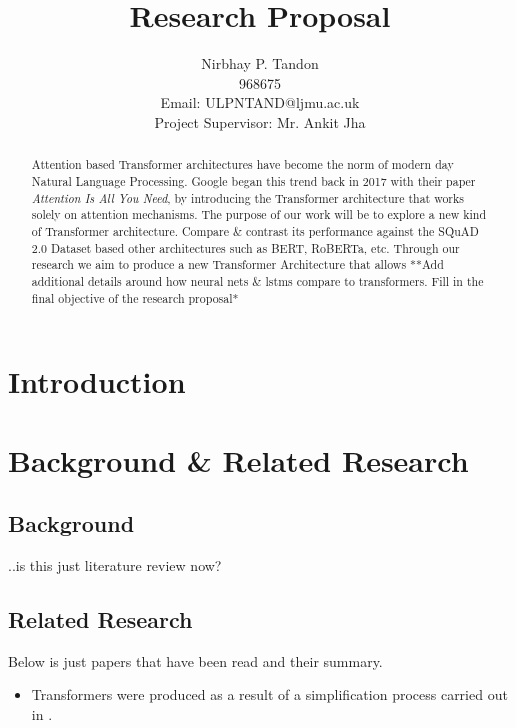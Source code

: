 \documentclass[11pt]{article}
\begin{document}
\title{Research Proposal}

\author{Nirbhay P. Tandon\\968675\\Email: ULPNTAND@ljmu.ac.uk\\
Project Supervisor: Mr. Ankit Jha
}
\date{}
\maketitle


\begin{abstract}
Attention based Transformer architectures have become the norm of modern day Natural Language Processing. Google began this trend back in 2017 with their paper \textit{Attention Is All You Need}\cite{atayl}, by introducing the Transformer architecture that works solely on attention mechanisms. The purpose of our work will be to explore a new kind of Transformer architecture. Compare \& contrast its performance against the SQuAD 2.0 Dataset\cite{dataset} based other architectures such as BERT\cite{bert}, RoBERTa\cite{roberta}, etc. Through our research we aim to produce a new Transformer Architecture that allows **Add additional details around how neural nets \& lstms compare to transformers. Fill in the final objective of the research proposal*
\end{abstract}
\newpage
\tableofcontents
\newpage
\section{Introduction}\label{Introduction}

\section{Background \& Related Research}\label{Section-Frameworks}

\subsection{Background}
..is this just literature review now?
\subsection{Related Research}
Below is just papers that have been read and their summary.

\begin{itemize}
	\item Transformers were produced as a result of a simplification process carried out in \cite{atayl}.
\end{itemize}
\newpage
\end{document}
